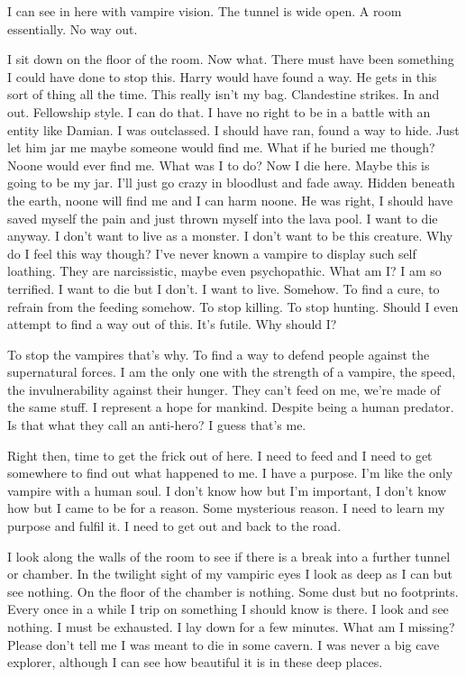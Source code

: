 I can see in here with vampire vision. The tunnel is wide open. A room essentially. No way out.

I sit down on the floor of the room. Now what. There must have been something I could have done to stop this. Harry would have found a way. He gets in this sort of thing all the time. This really isn't my bag. Clandestine strikes. In and out. Fellowship style. I can do that. I have no right to be in a battle with an entity like Damian. I was outclassed. I should have ran, found a way to hide. Just let him jar me maybe someone would find me. What if he buried me though? Noone would ever find me. What was I to do? Now I die here. Maybe this is going to be my jar. I'll just go crazy in bloodlust and fade away. Hidden beneath the earth, noone will find me and I can harm noone. He was right, I should have saved myself the pain and just thrown myself into the lava pool. I want to die anyway. I don't want to live as a monster. I don't want to be this creature. Why do I feel this way though? I've never known a vampire to display such self loathing. They are narcissistic, maybe even psychopathic. What am I? I am so terrified. I want to die but I don't. I want to live. Somehow. To find a cure, to refrain from the feeding somehow. To stop killing. To stop hunting. Should I even attempt to find a way out of this. It's futile. Why should I?

To stop the vampires that's why. To find a way to defend people against the supernatural forces. I am the only one with the strength of a vampire, the speed, the invulnerability against their hunger. They can't feed on me, we're made of the same stuff. I represent a hope for mankind. Despite being a human predator. Is that what they call an anti-hero? I guess that's me.

Right then, time to get the frick out of here. I need to feed and I need to get somewhere to find out what happened to me. I have a purpose. I'm like the only vampire with a human soul. I don't know how but I'm important, I don't know how but I came to be for a reason. Some mysterious reason. I need to learn my purpose and fulfil it. I need to get out and back to the road.

I look along the walls of the room to see if there is a break into a further tunnel or chamber. In the twilight sight of my vampiric eyes I look as deep as I can but see nothing. On the floor of the chamber is nothing. Some dust but no footprints. Every once in a while I trip on something I should know is there. I look and see nothing. I must be exhausted. I lay down for a few minutes. What am I missing? Please don't tell me I was meant to die in some cavern. I was never a big cave explorer, although I can see how beautiful it is in these deep places.


